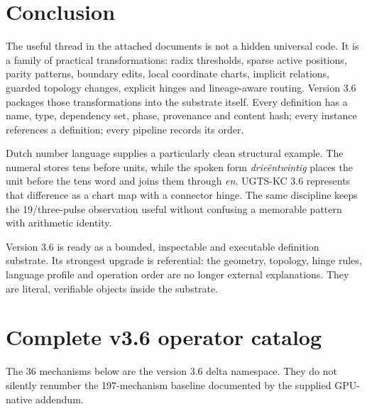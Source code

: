 \documentclass[10pt,a4paper]{article}
\newcommand{\code}[1]{\texttt{\detokenize{#1}}}
\begin{document}
\section{Conclusion}
The useful thread in the attached documents is not a hidden universal code. It is a family of practical transformations: radix thresholds, sparse active positions, parity patterns, boundary edits, local coordinate charts, implicit relations, guarded topology changes, explicit hinges and lineage-aware routing. Version 3.6 packages those transformations into the substrate itself. Every definition has a name, type, dependency set, phase, provenance and content hash; every instance references a definition; every pipeline records its order.

Dutch number language supplies a particularly clean structural example. The numeral \code{23} stores tens before units, while the spoken form \emph{drieëntwintig} places the unit before the tens word and joins them through \emph{en}. UGTS-KC 3.6 represents that difference as a chart map with a connector hinge. The same discipline keeps the 19/three-pulse observation useful without confusing a memorable pattern with arithmetic identity.

\begin{decisionbox}
Version 3.6 is ready as a bounded, inspectable and executable definition substrate. Its strongest upgrade is referential: the geometry, topology, hinge rules, language profile and operation order are no longer external explanations. They are literal, verifiable objects inside the substrate.
\end{decisionbox}

\clearpage
\appendix
\section{Complete v3.6 operator catalog}
The 36 mechanisms below are the version 3.6 delta namespace. They do not silently renumber the 197-mechanism baseline documented by the supplied GPU-native addendum.

\begingroup
\scriptsize
\setlength{\tabcolsep}{2.5pt}
\renewcommand{\arraystretch}{1.08}

\endgroup
\end{document}
